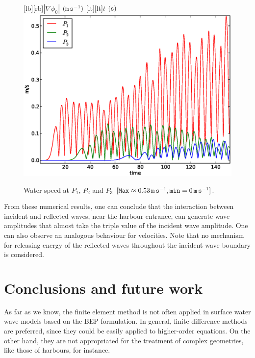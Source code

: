 \begin{figure}[!htb]
{\centering
{}[lb][rb]{$|\nabla \phi_0|$ $({\tt m\,s}^{-1})$}
[lt][lt]{$t$ $({\tt s})$}
\includegraphics[width=\largewidth]{chapters/lopes/eps/velprofile.eps}
\caption{Water speed  at $P_1$, $P_2$ and $P_3$
\([{\tt Max}\approx 0.53\, {\tt m\, s}^{-1}, {\tt min}=0\,{\tt m\, s}^{-1}]\).}\label{lopes:fig:velp}\par}
\end{figure}

From these numerical results, one can conclude that the
interaction between incident and reflected waves, near the harbour entrance,
 can generate wave amplitudes that  almost  take the
 triple value  of the incident wave amplitude.
One can also observe an analogous behaviour for
velocities.
Note that no
mechanism for releasing energy of the reflected waves
throughout the incident wave boundary is considered.


\section{Conclusions and future work}

As far as we know,  the finite element
method is not often applied in surface water wave models
based on the BEP formulation.
In general, finite difference methods are preferred, since
they could be easily applied to higher-order equations.
On the  other hand, they are not appropriated for the
treatment of complex geometries, like those of harbours,
for instance.

